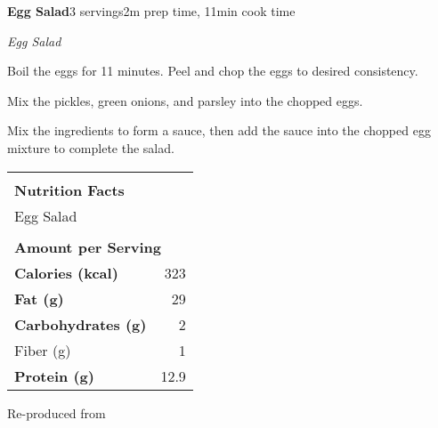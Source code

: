 \documentclass[../recipe-collections/cooking.tex]{subfiles}
\begin{document}
\begin{recipe}{\textbf{Egg Salad}}{3 servings}{2m prep time, 11min cook time}
  
  \freeform{}\textit{Egg Salad}


  Boil the eggs for 11 minutes. Peel and chop the eggs to desired consistency.


  Mix the pickles, green onions, and parsley into the chopped eggs.


  Mix the ingredients to form a sauce, then add the sauce into the chopped egg 
  mixture to complete the salad.

  \bigskip

  \begin{center}
  \begin{tabular}{|lr|}
  \hline
                                      &             \\
  \multicolumn{2}{|l|}{\huge{\textbf{Nutrition Facts}}}    \\
  \multicolumn{2}{|l|}{Egg Salad}                   \\
                                      &             \\
  \multicolumn{2}{|l|}{\footnotesize{\textbf{Amount per Serving}}} \\ \hline
  \textbf{Calories (kcal)}            & 323         \\ \hline
  \textbf{Fat (g)}                    & 29          \\ \hline
  \textbf{Carbohydrates (g)}          & 2           \\ \hline
  \hspace{2mm} Fiber (g)                   & 1           \\ \hline
  \textbf{Protein (g)}                & 12.9        \\ \hline
  \end{tabular}
  \end{center}

  \freeform{}\hrulefill{}


\end{recipe}

Re-produced from  \autocite{flavcity_2020}
  
\end{document}
